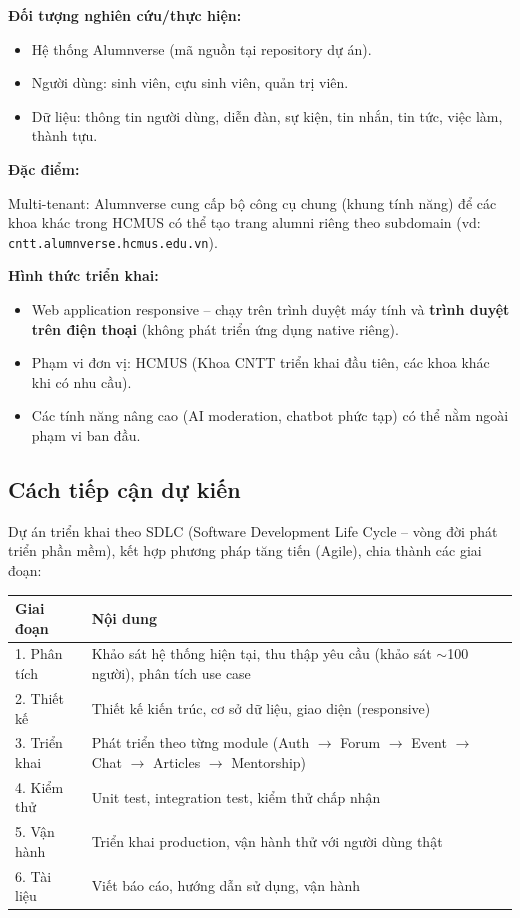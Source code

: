 \documentclass[12pt,a4paper]{article}
\begin{document}
\textbf{Đối tượng nghiên cứu/thực hiện:}

\begin{itemize}
    \item Hệ thống Alumnverse (mã nguồn tại repository dự án).
    \item Người dùng: sinh viên, cựu sinh viên, quản trị viên.
    \item Dữ liệu: thông tin người dùng, diễn đàn, sự kiện, tin nhắn, tin tức, việc làm, thành tựu.
\end{itemize}

\textbf{Đặc điểm:}

Multi-tenant: Alumnverse cung cấp bộ công cụ chung (khung tính năng) để các khoa khác trong HCMUS có thể tạo trang alumni riêng theo subdomain (vd: \texttt{cntt.alumnverse.hcmus.edu.vn}).

\textbf{Hình thức triển khai:}

\begin{itemize}
    \item Web application responsive -- chạy trên trình duyệt máy tính và \textbf{trình duyệt trên điện thoại} (không phát triển ứng dụng native riêng).
    \item Phạm vi đơn vị: HCMUS (Khoa CNTT triển khai đầu tiên, các khoa khác khi có nhu cầu).
    \item Các tính năng nâng cao (AI moderation, chatbot phức tạp) có thể nằm ngoài phạm vi ban đầu.
\end{itemize}

\subsection{Cách tiếp cận dự kiến}

Dự án triển khai theo SDLC (Software Development Life Cycle -- vòng đời phát triển phần mềm), kết hợp phương pháp tăng tiến (Agile), chia thành các giai đoạn:

\begin{table}[H]
\centering
\small
\begin{tabular}{|p{2.2cm}|p{\dimexpr\textwidth-4.5cm}|}
\hline
\textbf{Giai đoạn} & \textbf{Nội dung} \\
\hline
1. Phân tích & Khảo sát hệ thống hiện tại, thu thập yêu cầu (khảo sát $\sim$100 người), phân tích use case \\
\hline
2. Thiết kế & Thiết kế kiến trúc, cơ sở dữ liệu, giao diện (responsive) \\
\hline
3. Triển khai & Phát triển theo từng module (Auth $\rightarrow$ Forum $\rightarrow$ Event $\rightarrow$ Chat $\rightarrow$ Articles $\rightarrow$ Mentorship) \\
\hline
4. Kiểm thử & Unit test, integration test, kiểm thử chấp nhận \\
\hline
5. Vận hành & Triển khai production, vận hành thử với người dùng thật \\
\hline
6. Tài liệu & Viết báo cáo, hướng dẫn sử dụng, vận hành \\
\hline
\end{tabular}
\end{table}
\end{document}
